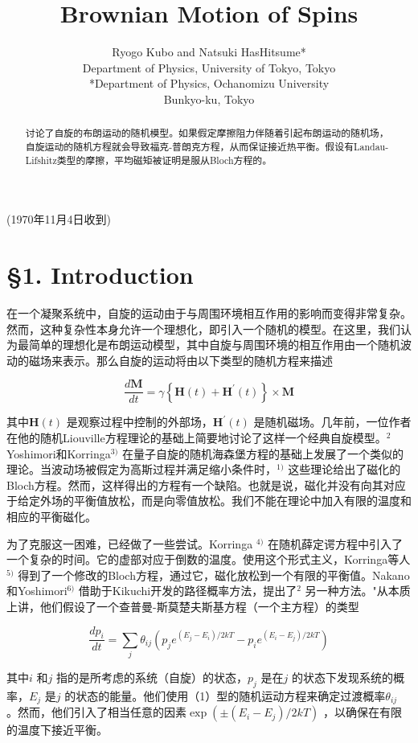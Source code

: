 \documentclass[10pt]{article}
\title{Brownian Motion of Spins }
\author{Ryogo Kubo and Natsuki HasHitsume*\\
Department of Physics, University of Tokyo, Tokyo\\
*Department of Physics, Ochanomizu University\\
Bunkyo-ku, Tokyo}
\date{}
\begin{document}
 
\maketitle 
(1970年11月4日收到)

\begin{abstract} 
讨论了自旋的布朗运动的随机模型。如果假定摩擦阻力伴随着引起布朗运动的随机场，自旋运动的随机方程就会导致福克-普朗克方程，从而保证接近热平衡。假设有Landau-Lifshitz类型的摩擦，平均磁矩被证明是服从Bloch方程的。
\end{abstract} 

\section{§1. Introduction} 
在一个凝聚系统中，自旋的运动由于与周围环境相互作用的影响而变得非常复杂。然而，这种复杂性本身允许一个理想化，即引入一个随机的模型。在这里，我们认为最简单的理想化是布朗运动模型，其中自旋与周围环境的相互作用由一个随机波动的磁场来表示。那么自旋的运动将由以下类型的随机方程来描述

\[
\frac{d \boldsymbol{M}}{d t}=\gamma\left\{\boldsymbol{H}(t)+\boldsymbol{H}^{\prime}(t)\right\} \times \boldsymbol{M}
\] 

其中\(\boldsymbol{H}(t)\) 是观察过程中控制的外部场，\(\boldsymbol{H}^{\prime}(t)\) 是随机磁场。几年前，一位作者在他的随机Liouville方程理论的基础上简要地讨论了这样一个经典自旋模型。\({ }^{2}\) Yoshimori和Korringa\({ }^{3)}\) 在量子自旋的随机海森堡方程的基础上发展了一个类似的理论。当波动场被假定为高斯过程并满足缩小条件时，\({ }^{1)}\) 这些理论给出了磁化的Bloch方程。然而，这样得出的方程有一个缺陷。也就是说，磁化并没有向其对应于给定外场的平衡值放松，而是向零值放松。我们不能在理论中加入有限的温度和相应的平衡磁化。

为了克服这一困难，已经做了一些尝试。Korringa \({ }^{4)}\) 在随机薛定谔方程中引入了一个复杂的时间。它的虚部对应于倒数的温度。使用这个形式主义，Korringa等人\({ }^{5)}\) 得到了一个修改的Bloch方程，通过它，磁化放松到一个有限的平衡值。Nakano和Yoshimori\({ }^{6)}\) 借助于Kikuchi开发的路径概率方法，提出了\(^{2}\) 另一种方法。"从本质上讲，他们假设了一个查普曼-斯莫楚夫斯基方程（一个主方程）的类型

\[
\frac{d p_{i}}{d t}=\sum_{j} \theta_{i j}\left(p_{j} e^{\left(E_{j}-E_{i}\right) / 2 k T}-p_{i} e^{\left(E_{i}-E_{j}\right) / 2 k T}\right)
\] 

其中\(i\) 和\(j\) 指的是所考虑的系统（自旋）的状态，\(p_{j}\) 是在\(j\) 的状态下发现系统的概率，\(E_{j}\) 是\(j\) 的状态的能量。他们使用（1）型的随机运动方程来确定过渡概率\(\theta_{i j}\) 。然而，他们引入了相当任意的因素\(\exp \left( \pm\left(E_{i}-E_{j}\right) / 2 k T\right)\) ，以确保在有限的温度下接近平衡。
\end{document}
